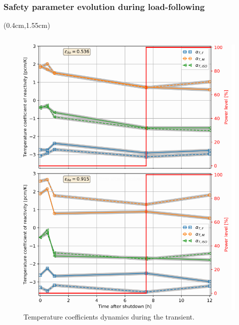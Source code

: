 \begin{frame}
\frametitle{Safety parameter evolution during load-following}
\begin{textblock*}{12.5cm}(0.4cm,1.55cm) %
	\begin{columns}
		\column[t]{6.3cm}
		\begin{figure}[t]
			\begin{overprint}
				\includegraphics[width=0.87\linewidth]{./images/msbr_tc_evo.png}
				\vspace{-2mm}
				\caption{Temperature coefficients dynamics during the 
				transient.}

\end{overprint}
\end{figure}
\end{columns}
\end{textblock*}
\end{frame}
